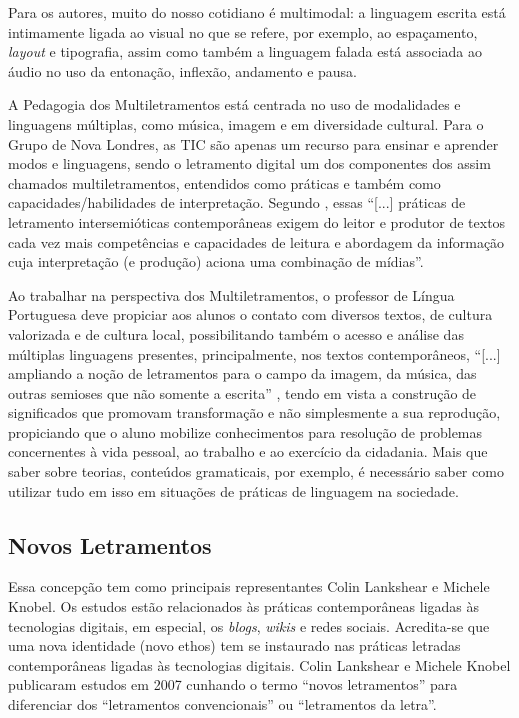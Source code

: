 \documentclass{textolivre}
\begin{document}
Para os autores, muito do nosso cotidiano é multimodal: a linguagem escrita
está intimamente ligada ao visual no que se refere, por exemplo, ao
espaçamento, \emph{layout} e tipografia, assim como também a linguagem falada está
associada ao áudio no uso da entonação, inflexão, andamento e pausa.

A Pedagogia dos Multiletramentos está centrada no uso de modalidades e
linguagens múltiplas, como música, imagem e em diversidade cultural. Para o
Grupo de Nova Londres, as TIC são apenas um recurso para ensinar e aprender
modos e linguagens, sendo o letramento digital um dos componentes dos assim
chamados multiletramentos, entendidos como práticas e também como
capacidades/habilidades de interpretação. Segundo \textcite[p. 81]{kleiman2014}, essas
“[...] práticas de letramento intersemióticas contemporâneas exigem do leitor e
produtor de textos cada vez mais competências e capacidades de leitura e
abordagem da informação cuja interpretação (e produção) aciona uma combinação
de mídias”.

Ao trabalhar na perspectiva dos Multiletramentos, o professor de Língua
Portuguesa deve propiciar aos alunos o contato com diversos textos, de cultura
valorizada e de cultura local, possibilitando também o acesso e análise das
múltiplas linguagens presentes, principalmente, nos textos contemporâneos,
“[...] ampliando a noção de letramentos para o campo da imagem, da música, das
outras semioses que não somente a escrita” \cite[p. 107]{rojo2009}, tendo em vista
a construção de significados que promovam transformação e não simplesmente a
sua reprodução, propiciando que o aluno mobilize conhecimentos para resolução
de problemas concernentes à vida pessoal, ao trabalho e ao exercício da
cidadania. Mais que saber sobre teorias, conteúdos gramaticais, por exemplo, é
necessário saber como utilizar tudo em isso em situações de práticas de
linguagem na sociedade.


\subsection{Novos Letramentos}\label{sec-novos-letramentos}
Essa concepção tem como principais representantes Colin Lankshear e Michele
Knobel. Os estudos estão relacionados às práticas contemporâneas ligadas às
tecnologias digitais, em especial, os \emph{blogs}, \emph{wikis} e redes sociais. Acredita-se
que uma nova identidade (novo ethos) tem se instaurado nas práticas letradas
contemporâneas ligadas às tecnologias digitais. Colin Lankshear e Michele
Knobel publicaram estudos em 2007 cunhando o termo “novos letramentos” para
diferenciar dos “letramentos convencionais” ou “letramentos da letra”.
\end{document}

